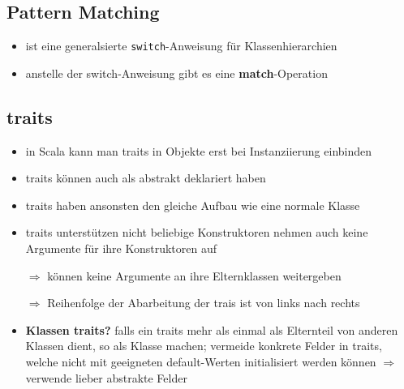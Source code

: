 \subsection{Pattern Matching}
\begin{itemize}
  \item ist eine generalsierte \texttt{switch}-Anweisung für Klassenhierarchien
  \item anstelle der switch-Anweisung gibt es eine \textbf{match}-Operation
  
  

\end{itemize}


\subsection{traits}
\begin{itemize}
  \item in Scala kann man traits in Objekte erst bei Instanziierung einbinden
  \item traits können auch als abstrakt deklariert haben
  \item traits haben ansonsten den gleiche Aufbau wie eine normale
  Klasse
  \item traits unterstützen nicht beliebige Konstruktoren \und nehmen auch
  keine Argumente für ihre Konstruktoren auf
  
  $\Rightarrow$ können keine Argumente an ihre Elternklassen weitergeben
  
  
  
  $\Rightarrow$ Reihenfolge der Abarbeitung der trais ist von links nach
  rechts

  \item \textbf{Klassen \oder traits?} falls ein traits mehr als einmal als 
  Elternteil von anderen Klassen dient, so als Klasse machen; vermeide 
  konkrete Felder in traits, welche nicht mit geeigneten default-Werten
  initialisiert werden können $\Rightarrow$ verwende lieber abstrakte Felder
\end{itemize}
\pagebreak


